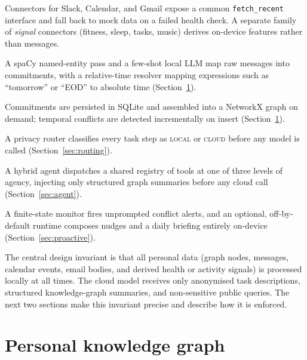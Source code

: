 \documentclass{ecai}
\begin{document}
\begin{description}[leftmargin=1.2em,itemsep=2pt]
  \item[Ingestion.] Connectors for Slack, Calendar, and Gmail expose a common
        \texttt{fetch\_recent} interface and fall back to mock data on a failed
        health check. A separate family of \emph{signal} connectors (fitness,
        sleep, tasks, music) derives on-device features rather than messages.
  \item[Extraction.] A spaCy named-entity pass and a few-shot local LLM map
        raw messages into commitments, with a relative-time resolver mapping
        expressions such as ``tomorrow'' or ``EOD'' to absolute time
        (Section~\ref{sec:kg}).
  \item[Knowledge graph.] Commitments are persisted in SQLite and assembled
        into a NetworkX graph on demand; temporal conflicts are detected
        incrementally on insert (Section~\ref{sec:kg}).
  \item[Routing.] A privacy router classifies every task step as \textsc{local}
        or \textsc{cloud} before any model is called (Section~\ref{sec:routing}).
  \item[Agent.] A hybrid agent dispatches a shared registry of tools at one of
        three levels of agency, injecting only structured graph summaries before
        any cloud call (Section~\ref{sec:agent}).
  \item[Proactive layer.] A finite-state monitor fires unprompted conflict
        alerts, and an optional, off-by-default runtime composes nudges and a
        daily briefing entirely on-device (Section~\ref{sec:proactive}).
\end{description}

The central design invariant is that all personal data (graph nodes, messages,
calendar events, email bodies, and derived health or activity signals) is
processed locally at all times. The cloud model receives only anonymised
task descriptions, structured knowledge-graph summaries, and non-sensitive
public queries. The next two sections make this invariant precise and describe
how it is enforced.


\section{Personal knowledge graph}\label{sec:kg}
\end{document}
